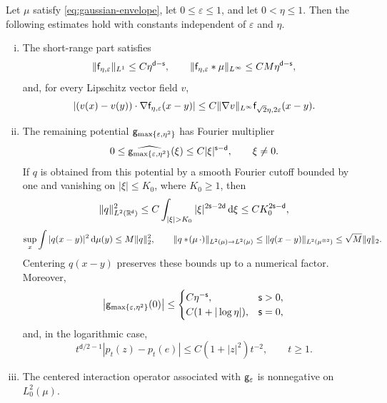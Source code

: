 \documentclass[11pt,reqno]{amsart}
\numberwithin{equation}{section}
\theoremstyle{plain}
\theoremstyle{remark}
\DeclarePairedDelimiter{\norm}{\lVert}{\rVert}
\renewcommand{\d}{\mathsf{d}}\newcommand{\s}{\mathsf{s}}
\begin{document}
\begin{lemma}\label{lem:heat-potential-estimates}
Let $\mu$ satisfy \eqref{eq:gaussian-envelope}, let $0\le\varepsilon\le1$, and let $0<\eta\le1$. Then the following estimates hold with constants independent of $\varepsilon$ and $\eta$.
\begin{enumerate}[(i)]
\item The short-range part satisfies
\begin{equation}\label{eq:heat-short-mass}
 \norm{\mathsf f_{\eta,\varepsilon}}_{L^1}
 \le C\eta^{\d-\s},\qquad
 \norm{\mathsf f_{\eta,\varepsilon}*\mu}_{L^\infty}
 \le CM\eta^{\d-\s},
\end{equation}
and, for every Lipschitz vector field $v$,
\begin{equation}\label{eq:heat-short-transport}
 |(v(x)-v(y))\cdot\nabla\mathsf f_{\eta,\varepsilon}(x-y)|
 \le C\norm{\nabla v}_{L^\infty}\mathsf f_{\sqrt2\eta,2\varepsilon}(x-y).
\end{equation}
\item The remaining potential $\mathsf g_{\max\{\varepsilon,\eta^2\}}$ has Fourier multiplier
\begin{equation}\label{eq:heat-long-fourier}
 0\le\widehat{\g_{\max\{\varepsilon,\eta^2\}}}(\xi)
 \le C|\xi|^{\s-\d},\qquad \xi\ne0.
\end{equation}
If $q$ is obtained from this potential by a smooth Fourier cutoff bounded by one and vanishing on $|\xi|\le K_0$, where $K_0\ge1$, then
\begin{equation}\label{eq:heat-high-frequency}
 \norm q_{L^2(\R^\d)}^2
 \le C\int_{|\xi|>K_0}|\xi|^{2\s-2\d}\dd\xi
 \le CK_0^{2\s-\d},
\end{equation}
\begin{equation}\label{eq:heat-row-operator}
 \sup_x\int|q(x-y)|^2\dd\mu(y)\le M\norm q_2^2,\qquad
 \norm{q*\!(\mu\,\cdot)}_{L^2(\mu)\to L^2(\mu)}
 \le\norm{q(x-y)}_{L^2(\mu^{\otimes2})}\le\sqrt M\norm q_2.
\end{equation}
Centering $q(x-y)$ preserves these bounds up to a numerical factor. Moreover,
\begin{equation}\label{eq:heat-long-diagonal}
 \left|\g_{\max\{\varepsilon,\eta^2\}}(0)\right|
 \le\begin{cases}C\eta^{-\s},&\s>0,\\ C(1+|\log\eta|),&\s=0,\end{cases}
\end{equation}
and, in the logarithmic case,
\begin{equation}\label{eq:heat-log-infrared}
 t^{\d/2-1}|p_t(z)-p_t(e)|\le C(1+|z|^2)t^{-2},
 \qquad t\ge1.
\end{equation}
\item The centered interaction operator associated with $\mathsf g_\varepsilon$ is nonnegative on $L^2_0(\mu)$.
\end{enumerate}
\end{lemma}
\end{document}
